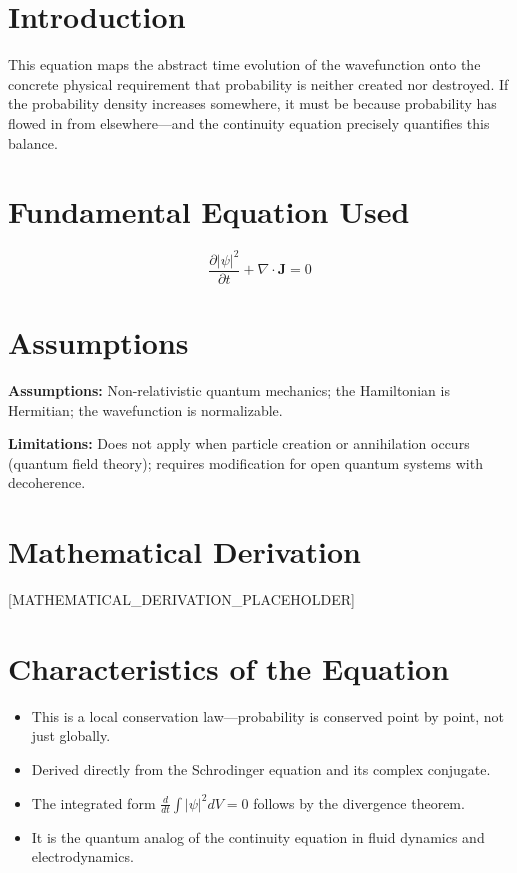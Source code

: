 \documentclass[11pt,openright]{book}
\begin{document}
\section*{Introduction}

This equation maps the abstract time evolution of the wavefunction onto the concrete physical requirement that probability is neither created nor destroyed. If the probability density increases somewhere, it must be because probability has flowed in from elsewhere---and the continuity equation precisely quantifies this balance.
\section*{Fundamental Equation Used}

\begin{equation}
\frac{\partial |\psi|^2}{\partial t} + \nabla \cdot \mathbf{J} = 0
\end{equation}
\section*{Assumptions}

\textbf{Assumptions:} Non-relativistic quantum mechanics; the Hamiltonian is Hermitian; the wavefunction is normalizable.


\textbf{Limitations:} Does not apply when particle creation or annihilation occurs (quantum field theory); requires modification for open quantum systems with decoherence.


\section*{Mathematical Derivation}

[MATHEMATICAL_DERIVATION_PLACEHOLDER]

\section*{Characteristics of the Equation}

\begin{itemize}
    \item This is a local conservation law---probability is conserved point by point, not just globally.
    \item Derived directly from the Schrodinger equation and its complex conjugate.
    \item The integrated form $\frac{d}{dt}\int|\psi|^2 dV = 0$ follows by the divergence theorem.
    \item It is the quantum analog of the continuity equation in fluid dynamics and electrodynamics.
\end{itemize}
\end{document}
